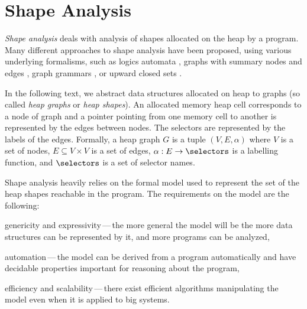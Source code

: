 \section{Shape Analysis}
\emph{Shape analysis} deals with analysis of shapes allocated on the heap by a program.
Many different approaches to shape analysis have been proposed, using various
underlying formalisms, such as logics
\cite{jensen,pale01,pale,Reynolds:SepLogic:02,InvaderCAV07,indPrSynt07,ndqc07,Zee:pldi08,InvaderCAV08,abduction11,mpq11,slayer11,predator11,overlaid11,indPrSynt07,thor10,sas07:chang_rival_necula,dragoi:atva12,sleek13}
automata \cite{bhrv06b,deg06,forester12,boxes13,lists-counters},
graphs with summary nodes and edges \cite{sas07:chang_rival_necula,dudka13sas},
graph grammars \cite{juggrnaut10,juggrnaut-learning12}, or upward closed sets \cite{paroshBackward}.


In the following text, we abstract data structures allocated on heap to graphs (so called \emph{heap graphs}
or \emph{heap shapes}).
An allocated memory heap cell corresponds to a node of graph and a pointer pointing from one memory cell
to another is represented by the edges between nodes.
The selectors are represented by the labels of the edges.
Formally, a heap graph $G$ is a tuple $(V,E,\alpha)$ where $V$ is a set of nodes, $E \subseteq V \times V$ is
a set of edges, $\alpha: E \rightarrow \selectors$ is a labelling function, and $\selectors$ is a set
of selector names.

	  Shape analysis heavily relies on the formal model used to represent the set of the heap shapes
	  reachable in the program.
	  The requirements on the model are the following:
	  \begin{enumerate*}[label=(\alph*)]
	  	\item genericity and expressivity\,---\,the more general the model will be the more data structures can be
	  		represented by it, and more programs can be analyzed,
	  	\item automation\,---\,the model can be derived from a program automatically and have decidable
			properties important for reasoning about the program,
	  	\item efficiency and scalability\,---\,there exist efficient algorithms manipulating the model
			even when it is applied to big systems.
	  \end{enumerate*}

